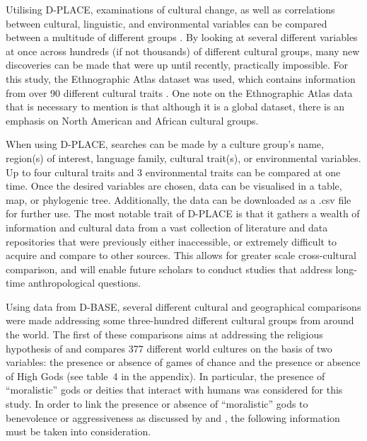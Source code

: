  Utilising D-PLACE, examinations of cultural change, as well as correlations between cultural, linguistic, and environmental variables can be compared between a multitude of different groups \parencite{kirby2016}. By looking at several different variables at once across hundreds (if not thousands) of different cultural groups, many new discoveries can be made that were up until recently, practically impossible. For this study, the Ethnographic Atlas dataset was used, which contains information from over 90 different cultural traits \parencite{kirby2016}. One note on the Ethnographic Atlas data that is necessary to mention is that although it is a global dataset, there is an emphasis on North American and African cultural groups.
 
 When using D-PLACE, searches can be made by a culture group’s name, region(s) of interest, language family, cultural trait(s), or environmental variables. Up to four cultural traits and 3 environmental traits can be compared at one time. Once the desired variables are chosen, data can be visualised in a table, map, or phylogenic tree. Additionally, the data can be downloaded as a .csv file for further use. The most notable trait of D-PLACE is that it gathers a wealth of information and cultural data from a vast collection of literature and data repositories \parencite{kirby2016} that were previously either inaccessible, or extremely difficult to acquire and compare to other sources. This allows for greater scale cross-cultural comparison, and will enable future scholars to conduct studies that address long-time anthropological questions.

Using data from D-BASE, several different cultural and geographical comparisons were made addressing some three-hundred different cultural groups from around the world. The first of these comparisons aims at addressing the religious hypothesis of \textcite{roberts1959} and compares 377 different world cultures on the basis of two variables: the presence or absence of games of chance and the presence or absence of High Gods (see table~4 in the appendix).
 In particular, the presence of \enquote{moralistic} gods or deities that interact with humans was considered for this study. In order to link the presence or absence of \enquote{moralistic} gods to benevolence or aggressiveness as discussed by \textcite{lambert1959} and \textcite{roberts1959}, the following information must be taken into consideration. 

